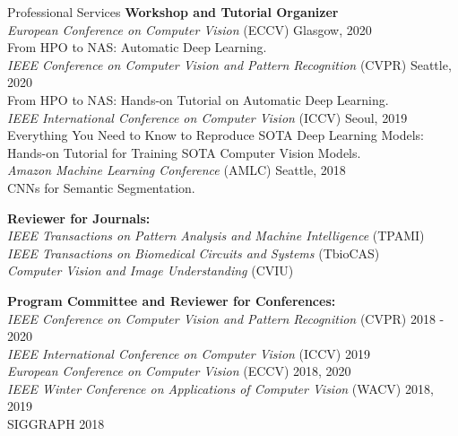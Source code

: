 \documentclass{resume} %
\begin{document}
\begin{rSection}{Professional Services}
{\bf Workshop and Tutorial Organizer} \\
{\it European Conference on Computer Vision} (ECCV) \hfill{Glasgow, 2020}\\
From HPO to NAS: Automatic Deep Learning. \\

{\it IEEE Conference on Computer Vision and Pattern Recognition} (CVPR) \hfill{Seattle, 2020}\\
From HPO to NAS: Hands-on Tutorial on Automatic Deep Learning. \\

{\it IEEE International Conference on Computer Vision} (ICCV) \hfill{Seoul, 2019}\\
Everything You Need to Know to Reproduce SOTA Deep Learning Models: \\
Hands-on Tutorial for Training SOTA Computer Vision Models. \\

{\it Amazon Machine Learning Conference} (AMLC) \hfill{Seattle, 2018}\\
CNNs for Semantic Segmentation. 

{\bf Reviewer for Journals:} \\
{\it IEEE Transactions on Pattern Analysis and Machine Intelligence} (TPAMI) \\
{\it IEEE Transactions on Biomedical Circuits and Systems} (TbioCAS) \\
{\it Computer Vision and Image Understanding} (CVIU)

{\bf Program Committee and Reviewer for Conferences:} \\
{\it IEEE Conference on Computer Vision and Pattern Recognition} (CVPR) \hfill{2018 - 2020}\\
{\it IEEE International Conference on Computer Vision} (ICCV)  \hfill{2019}\\
{\it European Conference on Computer Vision} (ECCV) \hfill{2018, 2020}\\
{\it IEEE Winter Conference on Applications of Computer Vision} (WACV)  \hfill{2018, 2019}\\
SIGGRAPH  \hfill{2018}


\end{rSection}
\end{document}
